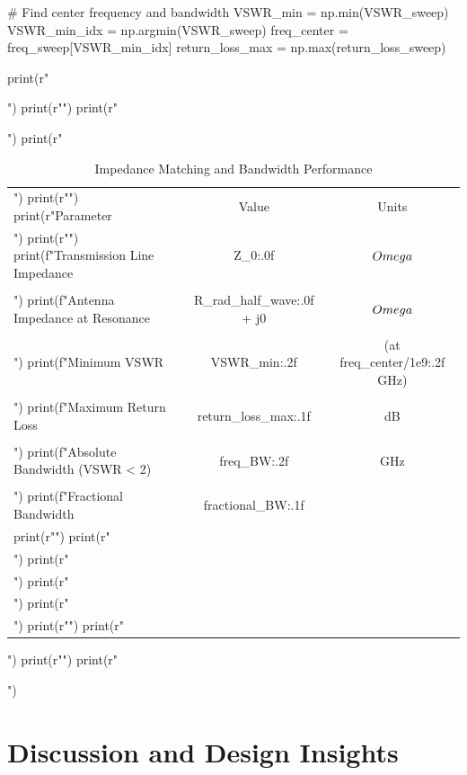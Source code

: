 \documentclass[a4paper, 11pt]{article}
\begin{document}
\begin{pycode}
# Find center frequency and bandwidth
VSWR_min = np.min(VSWR_sweep)
VSWR_min_idx = np.argmin(VSWR_sweep)
freq_center = freq_sweep[VSWR_min_idx]
return_loss_max = np.max(return_loss_sweep)

print(r"\begin{table}[htbp]")
print(r"\centering")
print(r"\caption{Impedance Matching and Bandwidth Performance}")
print(r"\begin{tabular}{lcc}")
print(r"\toprule")
print(r"Parameter & Value & Units \\")
print(r"\midrule")
print(f"Transmission Line Impedance & {Z_0:.0f} & $\\Omega$ \\\\")
print(f"Antenna Impedance at Resonance & {R_rad_half_wave:.0f} + j0 & $\\Omega$ \\\\")
print(f"Minimum VSWR & {VSWR_min:.2f} & (at {freq_center/1e9:.2f} GHz) \\\\")
print(f"Maximum Return Loss & {return_loss_max:.1f} & dB \\\\")
print(f"Absolute Bandwidth (VSWR < 2) & {freq_BW:.2f} & GHz \\\\")
print(f"Fractional Bandwidth & {fractional_BW:.1f} & \\%
print(r"\midrule")
print(r"\multicolumn{3}{l}{Bandwidth Improvement Techniques:} \\")
print(r"\multicolumn{3}{l}{\ \ - Wideband matching network (L-section, stub)} \\")
print(r"\multicolumn{3}{l}{\ \ - Sleeve dipole or folded dipole geometry} \\")
print(r"\multicolumn{3}{l}{\ \ - Log-periodic or biconical design} \\")
print(r"\bottomrule")
print(r"\end{tabular}")
print(r"\label{tab:impedance_analysis}")
print(r"\end{table}")
\end{pycode}

\section{Discussion and Design Insights}
\end{document}
